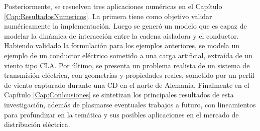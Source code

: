 Posteriormente, se resuelven tres aplicaciones numéricas en el Capítulo \ref{Cap:ResultadosNumericos}. La primera tiene como objetivo validar numéricamente la implementación. Luego se generó un modelo que es capaz de modelar la dinámica de interacción entre la cadena aisladora y el conductor. Habiendo validado la formulación para los ejemplos anteriores, se modela un ejemplo de un conductor eléctrico sometido a una carga artificial, extraída de un viento tipo \gls{CLA}. Por último, se presenta un problema realista de un sistema de transmisión eléctrica, con geometrías y propiedades reales, sometido por un perfil de viento capturado durante una CD en el norte de Alemania. Finalmente en el Capítulo \ref{Cap:Conlcusiones} se sintetizan los principales resultados de esta investigación, además de plasmarse eventuales trabajos a futuro, con lineamientos para profundizar en la temática y sus posibles aplicaciones en el mercado de distribución eléctrica.  
